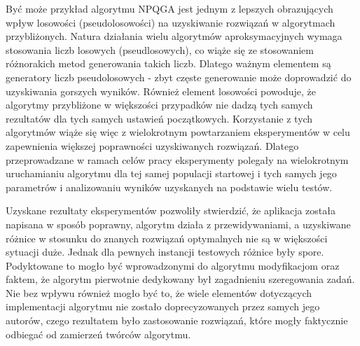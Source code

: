 Być może przykład algorytmu NPQGA jest jednym z lepszych obrazujących wpływ losowości (pseudolosowości) na uzyskiwanie rozwiązań w algorytmach przybliżonych. Natura działania wielu algorytmów aproksymacyjnych wymaga stosowania liczb losowych (pseudlosowych), co wiąże się ze stosowaniem różnorakich metod generowania takich liczb. Dlatego ważnym elementem są generatory liczb pseudolosowych - zbyt częste generowanie może doprowadzić do uzyskiwania gorszych wyników. Również element losowości powoduje, że algorytmy przybliżone w większości przypadków nie dadzą tych samych rezultatów dla tych samych ustawień początkowych. Korzystanie z tych algorytmów wiąże się więc z wielokrotnym powtarzaniem eksperymentów w celu zapewnienia większej poprawności uzyskiwanych rozwiązań. Dlatego przeprowadzane w ramach celów pracy eksperymenty polegały na wielokrotnym uruchamianiu algorytmu dla tej samej populacji startowej i tych samych jego parametrów i analizowaniu wyników uzyskanych na podstawie wielu testów.

Uzyskane rezultaty eksperymentów pozwoliły stwierdzić, że aplikacja została napisana w sposób poprawny, algorytm działa z przewidywaniami, a uzyskiwane różnice w stosunku do znanych rozwiązań optymalnych nie są w większości sytuacji duże. Jednak dla pewnych instancji testowych różnice były spore. Podyktowane to mogło być wprowadzonymi do algorytmu modyfikacjom oraz faktem, że algorytm pierwotnie dedykowany był zagadnieniu szeregowania zadań. Nie bez wpływu również mogło być to, że wiele elementów dotyczących implementacji algorytmu nie zostało doprecyzowanych przez samych jego autorów, czego rezultatem było zastosowanie rozwiązań, które mogły faktycznie odbiegać od zamierzeń twórców algorytmu. 